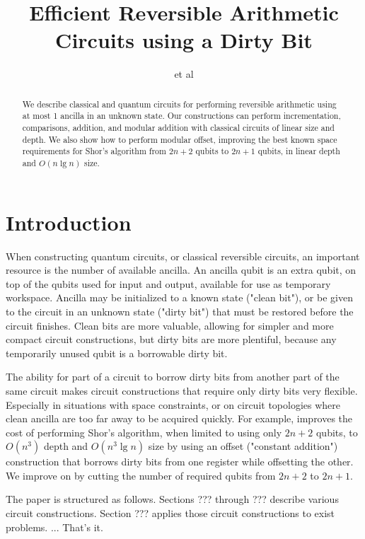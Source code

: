 \documentclass[twocolumn]{article}
\title{Efficient Reversible Arithmetic Circuits using a Dirty Bit}
\author{et al}
\begin{document}
\maketitle

\begin{abstract}
We describe classical and quantum circuits for performing reversible arithmetic using at most 1 ancilla in an unknown state.
Our constructions can perform incrementation, comparisons, addition, and modular addition with classical circuits of linear size and depth.
We also show how to perform modular offset, improving the best known space requirements for Shor's algorithm from $2n+2$ qubits to $2n+1$ qubits, in linear depth and $O(n \lg n)$ size.
\end{abstract}

\section{Introduction}

When constructing quantum circuits, or classical reversible circuits, an important resource is the number of available ancilla.
An ancilla qubit is an extra qubit, on top of the qubits used for input and output, available for use as temporary workspace.
Ancilla may be initialized to a known state ("clean bit"), or be given to the circuit in an unknown state ("dirty bit") that must be restored before the circuit finishes.
Clean bits are more valuable, allowing for simpler and more compact circuit constructions, but dirty bits are more plentiful, because any temporarily unused qubit is a borrowable dirty bit.

The ability for part of a circuit to borrow dirty bits from another part of the same circuit makes circuit constructions that require only dirty bits very flexible.
Especially in situations with space constraints, or on circuit topologies where clean ancilla are too far away to be acquired quickly.
For example, \cite{haner2016} improves the cost of performing Shor's algorithm, when limited to using only $2n+2$ qubits, to $O(n^3)$ depth and $O(n^3 \lg n)$ size by using an offset ("constant addition") construction that borrows dirty bits from one register while offsetting the other.
We improve on \cite{haner2016} by cutting the number of required qubits from $2n+2$ to $2n+1$.

The paper is structured as follows.
Sections ??? through ??? describe various circuit constructions.
Section ??? applies those circuit constructions to exist problems.
... That's it.
\end{document}
